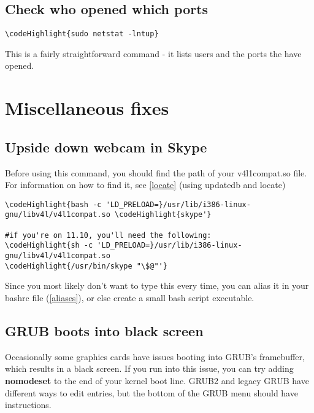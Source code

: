 \documentclass[12pt,a4paper]{article}
\begin{document}
\subsection{Check who opened which ports}
\begin{Verbatim}[commandchars=\\\{\}]
\codeHighlight{sudo netstat -lntup}
\end{Verbatim}
This is a fairly straightforward command - it lists users and the ports the have opened.

\section{Miscellaneous fixes}
\subsection{Upside down webcam in Skype}
Before using this command, you should find the path of your v4l1compat.so file. For information on how to find it, see \hyperref[locate]{\ref*{locate}} (using updatedb and locate)
\begin{Verbatim}[commandchars=\\\{\}]
\codeHighlight{bash -c 'LD_PRELOAD=}/usr/lib/i386-linux-gnu/libv4l/v4l1compat.so \codeHighlight{skype'}

#if you're on 11.10, you'll need the following:
\codeHighlight{sh -c 'LD_PRELOAD=}/usr/lib/i386-linux-gnu/libv4l/v4l1compat.so 
\codeHighlight{/usr/bin/skype "\$@"'}
\end{Verbatim}
Since you most likely don't want to type this every time, you can alias it in your bashrc file (\hyperref[aliases]{\ref*{aliases}}), or else create a small bash script executable.

\subsection{GRUB boots into black screen}
Occasionally some graphics cards have issues booting into GRUB's framebuffer, which results in a black screen.  If you run into this issue, you can try adding \textbf{nomodeset} to the end of your kernel boot line.  GRUB2 and legacy GRUB have different ways to edit entries, but the bottom of the GRUB menu should have instructions.
\end{document}
